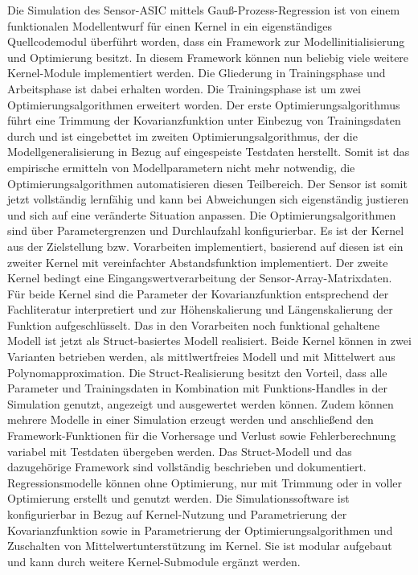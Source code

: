 \newline
Die Simulation des Sensor-ASIC mittels Gauß-Prozess-Regression ist von einem funktionalen Modellentwurf für einen Kernel in ein eigenständiges Quellcodemodul überführt worden, dass ein Framework zur Modellinitialisierung und Optimierung besitzt. In diesem Framework können nun beliebig viele weitere Kernel-Module implementiert werden. Die Gliederung in Trainingsphase und Arbeitsphase ist dabei erhalten worden. Die Trainingsphase ist um zwei Optimierungsalgorithmen erweitert worden. Der erste Optimierungsalgorithmus führt eine Trimmung der Kovarianzfunktion unter Einbezug von Trainingsdaten durch und ist eingebettet im zweiten Optimierungsalgorithmus, der die Modellgeneralisierung in Bezug auf eingespeiste Testdaten herstellt. Somit ist das empirische ermitteln von Modellparametern nicht mehr notwendig, die Optimierungsalgorithmen automatisieren diesen Teilbereich. Der Sensor ist somit jetzt vollständig lernfähig und kann bei Abweichungen sich eigenständig justieren und sich auf eine veränderte Situation anpassen. Die Optimierungsalgorithmen sind über Parametergrenzen und Durchlaufzahl konfigurierbar. Es ist der Kernel aus der Zielstellung bzw. Vorarbeiten implementiert, basierend auf diesen ist ein zweiter Kernel mit vereinfachter Abstandsfunktion implementiert. Der zweite Kernel bedingt eine Eingangswertverarbeitung der Sensor-Array-Matrixdaten. Für beide Kernel sind die Parameter der Kovarianzfunktion entsprechend der Fachliteratur interpretiert und zur Höhenskalierung und Längenskalierung der Funktion aufgeschlüsselt. Das in den Vorarbeiten noch funktional gehaltene Modell ist jetzt als Struct-basiertes Modell realisiert. Beide Kernel können in zwei Varianten betrieben werden, als mittlwertfreies Modell und mit Mittelwert aus Polynomapproximation. Die Struct-Realisierung besitzt den Vorteil, dass alle Parameter und Trainingsdaten in Kombination mit Funktions-Handles in der Simulation genutzt, angezeigt und ausgewertet werden können. Zudem können mehrere Modelle in einer Simulation erzeugt werden und anschließend den Framework-Funktionen für die Vorhersage und Verlust sowie Fehlerberechnung variabel mit Testdaten übergeben werden. Das Struct-Modell und das dazugehörige Framework sind vollständig beschrieben und dokumentiert. Regressionsmodelle können ohne Optimierung, nur mit Trimmung oder in voller Optimierung erstellt und genutzt werden. Die Simulationssoftware ist konfigurierbar in Bezug auf Kernel-Nutzung und Parametrierung der Kovarianzfunktion sowie in Parametrierung der Optimierungsalgorithmen und Zuschalten von Mittelwertunterstützung im Kernel. Sie ist modular aufgebaut und kann durch weitere Kernel-Submodule ergänzt werden.
